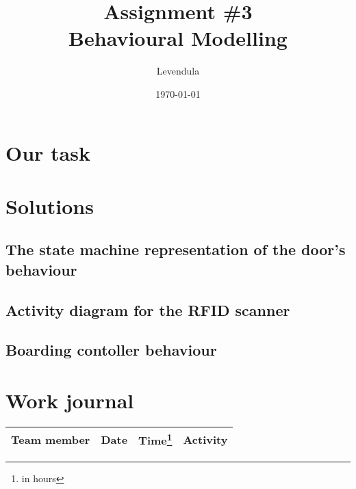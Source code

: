 \documentclass[a4paper]{article}
\title{Assignment \#3 \\ Behavioural Modelling}
\author{Levendula}
\date{\today}
\begin{document}


\tableofcontents
\listoffigures
\clearpage



\section{Our task}




\section{Solutions}

\subsection{The state machine representation of the door's behaviour}



\subsection{Activity diagram for the RFID scanner}



\subsection{Boarding contoller behaviour}




\section{Work journal}

\begin{tabularx}{\textwidth}{l l l X}
	\toprule
	Team member & Date & Time\footnote{in hours} & Activity \\ \midrule

	\bottomrule
\end{tabularx}

\clearpage
\glsaddall
\printglossaries
\end{document}

